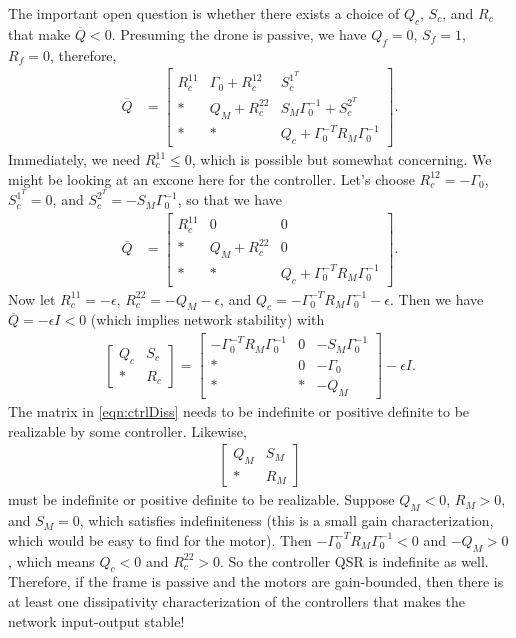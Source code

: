 \documentclass[10pt]{article}
\theoremstyle{definition}
\newcommand{\bmat}[1]{\begin{bmatrix} #1 \end{bmatrix}} %
\begin{document}
The important open question is whether there exists a choice of $Q_c$, $S_c$, and $R_c$ that make $\overline{Q}<0$. Presuming the drone is passive, we have $Q_f = 0$, $S_f = 1$, $R_f = 0$, therefore,
\begin{align*}
	\overline{Q} &=  \bmat{R_c^{11} & \Gamma_0 + R_c^{12} & S_c^{1^T} \\ * & Q_M + R_c^{22}  & S_M\Gamma_0^{-1} + S_c^{2^T} \\ * & * & Q_c + \Gamma_0^{-T}R_M\Gamma_0^{-1}}.
\end{align*}
Immediately, we need $R_c^{11}\leq 0$, which is possible but somewhat concerning. We might be looking at an excone here for the controller. Let's choose $R_c^{12} = -\Gamma_0$, $S_c^{1^T} = 0$, and $S_c^{2^T} = -S_M\Gamma_0^{-1}$, so that we have
\begin{align*}
	\overline{Q} &=  \bmat{R_c^{11} & 0 & 0 \\ * & Q_M + R_c^{22}  & 0 \\ * & * & Q_c + \Gamma_0^{-T}R_M\Gamma_0^{-1}}.
\end{align*}
Now let $R_c^{11} = -\epsilon$, $R_c^{22} = -Q_M-\epsilon$, and $Q_c = -\Gamma_0^{-T}R_M\Gamma_0^{-1} - \epsilon$. Then we have $\overline{Q} = -\epsilon I <0$ (which implies network stability) with
\begin{align}
	\bmat{Q_c & S_c \\ * & R_c} = \bmat{-\Gamma_0^{-T}R_M\Gamma_0^{-1} & 0 & -S_M\Gamma_0^{-1} \\ * & 0 & -\Gamma_0  \\ * & * & -Q_M} - \epsilon I. \label{eqn:ctrlDiss}
\end{align}
The matrix in \autoref{eqn:ctrlDiss} needs to be indefinite or positive definite to be realizable by some controller. Likewise, 
\begin{align*}
	\bmat{Q_M & S_M \\ * & R_M}	
\end{align*}
must be indefinite or positive definite to be realizable. Suppose $Q_M <0$, $R_M >0$, and $S_M = 0$, which satisfies indefiniteness (this is a small gain characterization, which would be easy to find for the motor). Then $-\Gamma_0^{-T}R_M\Gamma_0^{-1} <0$ and $-Q_M>0$, which means $Q_c<0$ and $R_c^{22}>0$. So the controller QSR is indefinite as well. Therefore, if the frame is passive and the motors are gain-bounded, then there is at least one dissipativity characterization of the controllers that makes the network input-output stable!
\end{document}
